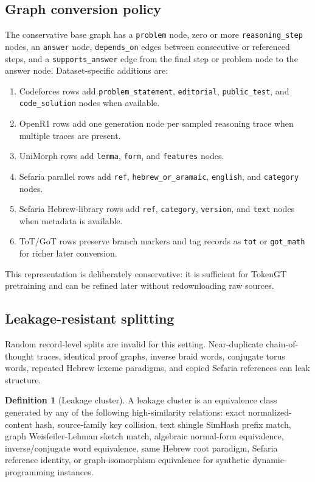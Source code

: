 \documentclass[11pt]{article}
\theoremstyle{definition}
\newtheorem{definition}{Definition}[section]
\theoremstyle{plain}
\theoremstyle{remark}
\numberwithin{equation}{section}
\begin{document}
\subsection{Graph conversion policy}

The conservative base graph has a \texttt{problem} node, zero or more \texttt{reasoning\_step} nodes, an \texttt{answer} node, \texttt{depends\_on} edges between consecutive or referenced steps, and a \texttt{supports\_answer} edge from the final step or problem node to the answer node.  Dataset-specific additions are:
\begin{enumerate}[leftmargin=2em]
  \item Codeforces rows add \texttt{problem\_statement}, \texttt{editorial}, \texttt{public\_test}, and \texttt{code\_solution} nodes when available.
  \item OpenR1 rows add one generation node per sampled reasoning trace when multiple traces are present.
  \item UniMorph rows add \texttt{lemma}, \texttt{form}, and \texttt{features} nodes.
  \item Sefaria parallel rows add \texttt{ref}, \texttt{hebrew\_or\_aramaic}, \texttt{english}, and \texttt{category} nodes.
  \item Sefaria Hebrew-library rows add \texttt{ref}, \texttt{category}, \texttt{version}, and \texttt{text} nodes when metadata is available.
  \item ToT/GoT rows preserve branch markers and tag records as \texttt{tot} or \texttt{got\_math} for richer later conversion.
\end{enumerate}
This representation is deliberately conservative: it is sufficient for TokenGT pretraining and can be refined later without redownloading raw sources.

\subsection{Leakage-resistant splitting}

Random record-level splits are invalid for this setting.  Near-duplicate chain-of-thought traces, identical proof graphs, inverse braid words, conjugate torus words, repeated Hebrew lexeme paradigms, and copied Sefaria references can leak structure.

\begin{definition}[Leakage cluster]
A leakage cluster is an equivalence class generated by any of the following high-similarity relations: exact normalized-content hash, source-family key collision, text shingle SimHash prefix match, graph Weisfeiler-Lehman sketch match, algebraic normal-form equivalence, inverse/conjugate word equivalence, same Hebrew root paradigm, Sefaria reference identity, or graph-isomorphism equivalence for synthetic dynamic-programming instances.
\end{definition}
\end{document}
